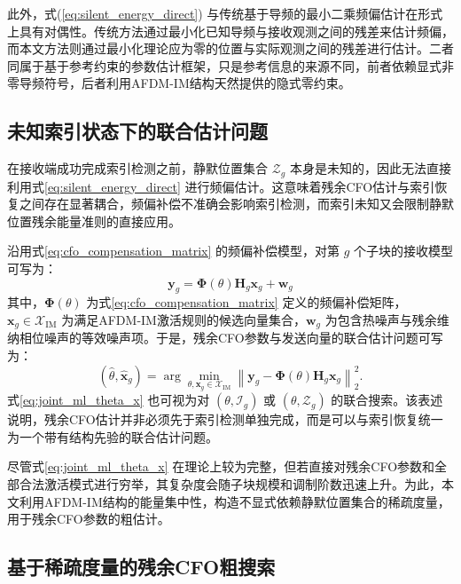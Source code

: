 此外，式(\ref{eq:silent_energy_direct}) 与传统基于导频的最小二乘频偏估计在形式上具有对偶性。传统方法通过最小化已知导频与接收观测之间的残差来估计频偏，而本文方法则通过最小化理论应为零的位置与实际观测之间的残差进行估计。二者同属于基于参考约束的参数估计框架，只是参考信息的来源不同，前者依赖显式非零导频符号，后者利用AFDM-IM结构天然提供的隐式零约束。

\subsection{未知索引状态下的联合估计问题}
\label{subsec:joint_estimation_unknown_index}

在接收端成功完成索引检测之前，静默位置集合 $\mathcal{Z}_g$ 本身是未知的，因此无法直接利用式\ref{eq:silent_energy_direct} 进行频偏估计。这意味着残余CFO估计与索引恢复之间存在显著耦合，频偏补偿不准确会影响索引检测，而索引未知又会限制静默位置残余能量准则的直接应用。

沿用式\ref{eq:cfo_compensation_matrix} 的频偏补偿模型，对第 $g$ 个子块的接收模型可写为：
\begin{equation}
    \mathbf{y}_g = \boldsymbol{\Phi}(\theta)\mathbf{H}_g\mathbf{x}_g + \mathbf{w}_g
    \label{eq:joint_ml_model}
\end{equation}
其中，$\boldsymbol{\Phi}(\theta)$ 为式\ref{eq:cfo_compensation_matrix} 定义的频偏补偿矩阵，$\mathbf{x}_g\in\mathcal{X}_{\mathrm{IM}}$ 为满足AFDM-IM激活规则的候选向量集合，$\mathbf{w}_g$ 为包含热噪声与残余维纳相位噪声的等效噪声项。于是，残余CFO参数与发送向量的联合估计问题可写为：
\begin{equation}
    (\hat{\theta},\hat{\mathbf{x}}_g)
    =
    \arg\min_{\theta,\mathbf{x}_g\in\mathcal{X}_{\mathrm{IM}}}
    \left\|\mathbf{y}_g-\boldsymbol{\Phi}(\theta)\mathbf{H}_g\mathbf{x}_g\right\|_2^2.
    \label{eq:joint_ml_theta_x}
\end{equation}
式\ref{eq:joint_ml_theta_x} 也可视为对 $(\theta,\mathcal{I}_g)$ 或 $(\theta,\mathcal{Z}_g)$ 的联合搜索。该表述说明，残余CFO估计并非必须先于索引检测单独完成，而是可以与索引恢复统一为一个带有结构先验的联合估计问题。

尽管式\ref{eq:joint_ml_theta_x} 在理论上较为完整，但若直接对残余CFO参数和全部合法激活模式进行穷举，其复杂度会随子块规模和调制阶数迅速上升。为此，本文利用AFDM-IM结构的能量集中性，构造不显式依赖静默位置集合的稀疏度量，用于残余CFO参数的粗估计。

\subsection{基于稀疏度量的残余CFO粗搜索}
\label{subsec:sparsity_coarse_search}

